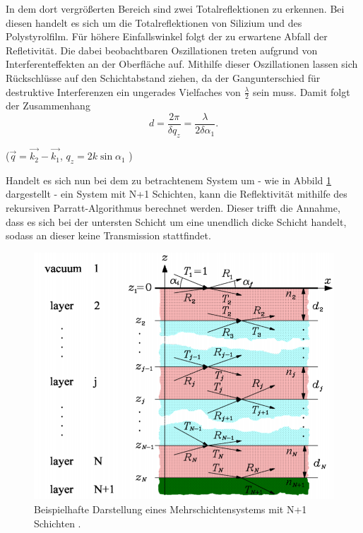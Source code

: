 In dem dort vergrößerten Bereich sind zwei Totalreflektionen zu erkennen. Bei diesen handelt es sich um die Totalreflektionen von Silizium und des Polystyrolfilm. Für höhere Einfallswinkel folgt der zu erwartene Abfall der Refletivität. Die dabei beobachtbaren Oszillationen treten aufgrund von Interferenteffekten an der Oberfläche auf. Mithilfe dieser Oszillationen lassen sich Rückschlüsse auf den Schichtabstand ziehen, da der Gangunterschied für destruktive Interferenzen ein ungerades Vielfaches von $\frac{\lambda}{2}$ sein muss. 
Damit folgt der Zusammenhang
\begin{equation}
    d = \frac{2 \pi}{\delta q_z} = \frac{\lambda}{2\delta \alpha_1} .
\end{equation}
\begin{center}
   \tiny{ ($\vec{q} = \vec{k_2}-\vec{k_1}$, $ q_z = 2k \sin{\alpha_1} $ ) }    
\end{center}
Handelt es sich nun bei dem zu betrachtenem System um - wie in Abbild \ref{fig:layer} dargestellt - ein System mit N+1 Schichten, kann die Reflektivität mithilfe des rekursiven Parratt-Algorithmus berechnet werden. Dieser trifft die Annahme, dass es sich bei der untersten Schicht um eine unendlich dicke Schicht handelt, sodass an dieser keine Transmission stattfindet. 

\begin{figure}[H]
    \centering
    \includegraphics[width = 0.8 \textwidth]{content/images/layers.png}
    \caption{Beispielhafte Darstellung eines Mehrschichtensystems mit N+1 Schichten \cite{e1}. }
    \label{fig:layer}
\end{figure}


